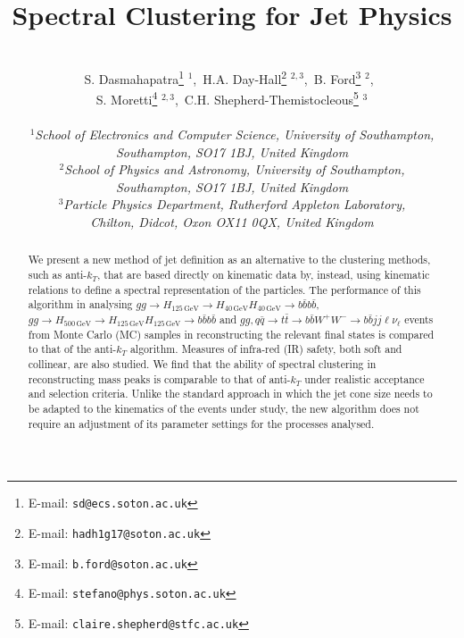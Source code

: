 \documentclass[12pt]{article}
\def\antikt{anti-$k_T$}
\begin{document}
\title{\hfill ~\\[-50mm]
                  \textbf{Spectral Clustering for Jet Physics
                }        }

\author{\\[-5mm]
S. Dasmahapatra\footnote{E-mail: {\tt sd@ecs.soton.ac.uk}} $^{1}$,\
H.A. Day-Hall\footnote{E-mail: {\tt hadh1g17@soton.ac.uk}} $^{2,3}$,\
B. Ford\footnote{E-mail: {\tt b.ford@soton.ac.uk}} $^{2}$,\ \\
S. Moretti\footnote{E-mail: {\tt stefano@phys.soton.ac.uk}} $^{2,3}$,\
C.H. Shepherd-Themistocleous\footnote{E-mail: {\tt claire.shepherd@stfc.ac.uk}} $^{3}$
\\ \\
\emph{\small $^1$School of Electronics and Computer Science, University of Southampton,}\\
\emph{\small Southampton, SO17 1BJ, United Kingdom}\\
\emph{\small $^2$School of Physics and Astronomy, University of Southampton,}\\
\emph{\small Southampton, SO17 1BJ, United Kingdom}\\
\emph{\small  $^3$Particle Physics Department, Rutherford Appleton Laboratory,}\\
\emph{\small Chilton, Didcot, Oxon OX11 0QX, United Kingdom}\\[4mm]
 }
%
\maketitle
%
\vspace*{-10mm}
%
\begin{abstract}
\noindent
We present a new method of jet definition as an alternative to the clustering methods, such as \antikt, that are based directly on kinematic data by, instead, using kinematic relations to define a spectral representation of the particles.
 The performance of this algorithm in analysing  
\(gg\to H_{125\,\text{GeV}} \rightarrow H_{40\,\text{GeV}} H_{40\,\text{GeV}} \rightarrow b \bar{b} b \bar{b}\),
\(gg\to H_{500\,\text{GeV}} \rightarrow H_{125\,\text{GeV}} H_{125\,\text{GeV}} \rightarrow b \bar{b} b \bar{b}\)
and
\(gg,q\bar q\to t\bar t\to b\bar b W^+W^-\to b\bar b jj \ell\nu_\ell\) events from 
Monte Carlo (MC) samples in reconstructing the relevant final states is compared to that of the \antikt{} algorithm.
 Measures of infra-red (IR) safety, both soft and collinear, are also studied. We find that the ability of spectral clustering in reconstructing mass peaks is comparable to that of \antikt{} under realistic acceptance and selection criteria.  Unlike the standard approach in which the jet cone size needs to be adapted to the  kinematics of the events under study, the new algorithm does not require an adjustment of its parameter settings for the processes analysed.
 \end{abstract}
\thispagestyle{empty}
\vfill
\newpage
%
    
    \FloatBarrier
    
    \FloatBarrier
    
    \FloatBarrier
    
    \FloatBarrier
    
    \FloatBarrier
\end{document}
